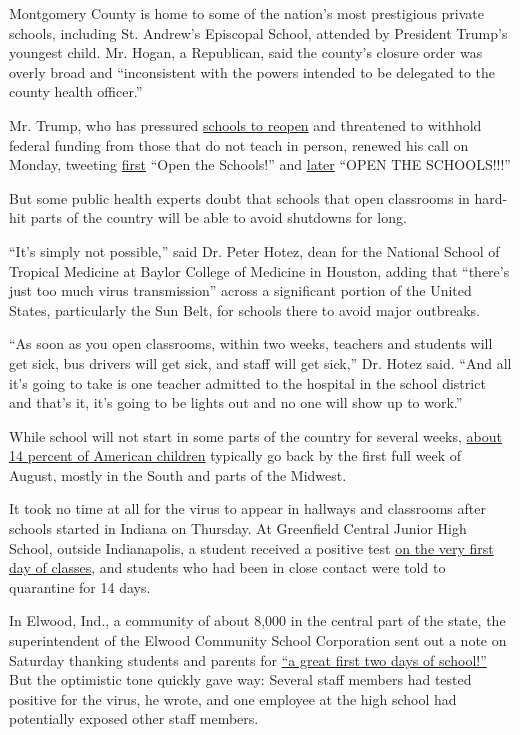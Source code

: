 Montgomery County is home to some of the nation's most prestigious
private schools, including St. Andrew's Episcopal School, attended by
President Trump's youngest child. Mr. Hogan, a Republican, said the
county's closure order was overly broad and ``inconsistent with the
powers intended to be delegated to the county health officer.''

Mr. Trump, who has pressured
\href{https://www.nytimes.com/2020/08/03/business/how-schools-reopen.html}{schools
to reopen} and threatened to withhold federal funding from those that do
not teach in person, renewed his call on Monday, tweeting
\href{https://twitter.com/realDonaldTrump/status/1290257055534551043}{first}
``Open the Schools!'' and
\href{https://twitter.com/realDonaldTrump/status/1290488364362170371}{later}
``OPEN THE SCHOOLS!!!''

But some public health experts doubt that schools that open classrooms
in hard-hit parts of the country will be able to avoid shutdowns for
long.

``It's simply not possible,'' said Dr. Peter Hotez, dean for the
National School of Tropical Medicine at Baylor College of Medicine in
Houston, adding that ``there's just too much virus transmission'' across
a significant portion of the United States, particularly the Sun Belt,
for schools there to avoid major outbreaks.

``As soon as you open classrooms, within two weeks, teachers and
students will get sick, bus drivers will get sick, and staff will get
sick,'' Dr. Hotez said. ``And all it's going to take is one teacher
admitted to the hospital in the school district and that's it, it's
going to be lights out and no one will show up to work.''

While school will not start in some parts of the country for several
weeks,
\href{https://www.pewresearch.org/fact-tank/2019/08/14/back-to-school-dates-u-s/}{about
14 percent of American children} typically go back by the first full
week of August, mostly in the South and parts of the Midwest.

It took no time at all for the virus to appear in hallways and
classrooms after schools started in Indiana on Thursday. At Greenfield
Central Junior High School, outside Indianapolis, a student received a
positive test
\href{https://www.nytimes.com/2020/08/01/us/schools-reopening-indiana-coronavirus.html}{on
the very first day of classes}, and students who had been in close
contact were told to quarantine for 14 days.

In Elwood, Ind., a community of about 8,000 in the central part of the
state, the superintendent of the Elwood Community School Corporation
sent out a note on Saturday thanking students and parents for
\href{https://www.facebook.com/ElwoodCommunitySchools/photos/pcb.1875944365880857/1875944205880873/?type=3\&theater}{``a
great first two days of school!''} But the optimistic tone quickly gave
way: Several staff members had tested positive for the virus, he wrote,
and one employee at the high school had potentially exposed other staff
members.

